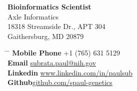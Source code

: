 \vspace{-3mm}
\parbox{0.5\textwidth}{ %
\begin{tabbing} %
\textbf{Bioinformatics Scientist}\\
Axle Informatics\\
18318 Streamside Dr., APT 304\\
Gaithersburg, MD 20879\\
\end{tabbing}}
\hfill %
\parbox{0.5\textwidth}{ %
	
\begin{tabbing} %
\hspace{2.5cm} \= \hspace{2cm} \= \kill %
{\bf Mobile Phone} \> +1 (765) 631 5129 \\ %
{\bf Email} \> \href{mailto:subrata.paul@nih.gov}{subrata.paul@nih.gov} \\ %
{\bf Linkedin}\> \href{https://www.linkedin.com/in/paulsub/}{www.linkedin.com/in/paulsub}\\
{\bf Github}\>\href{https://github.com/spaul-genetics}{github.com/spaul-genetics}
\end{tabbing}}